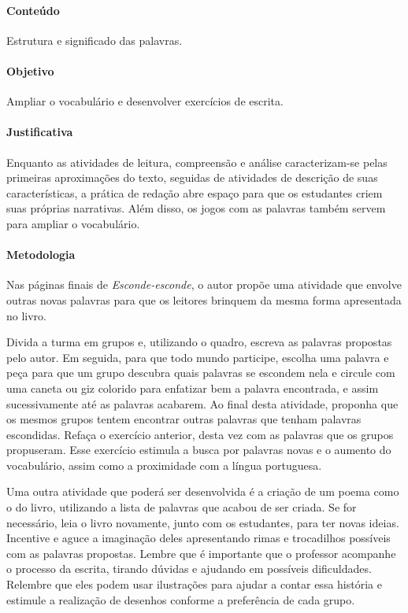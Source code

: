 \documentclass[11pt]{extarticle}
\begin{document}
\paragraph{Conteúdo} Estrutura e significado das palavras.

\paragraph{Objetivo} Ampliar o vocabulário e desenvolver exercícios de escrita.

\paragraph{Justificativa} Enquanto as atividades de leitura, compreensão e análise caracterizam-se pelas primeiras aproximações do texto, seguidas de atividades de descrição de suas características, a prática de redação abre espaço para que os estudantes criem suas próprias narrativas. Além disso, os jogos com as palavras também servem para ampliar o vocabulário. 

\paragraph{Metodologia} Nas páginas finais de \textit{Esconde-esconde}, o autor propõe uma atividade que envolve outras novas palavras para que os leitores brinquem da mesma forma apresentada no livro. 

Divida a turma em grupos e, utilizando o quadro, escreva as palavras propostas pelo autor. Em seguida, para que todo mundo participe, escolha uma palavra e peça para que um grupo descubra quais palavras se escondem nela e circule com uma caneta ou giz colorido para enfatizar bem a palavra encontrada, e assim sucessivamente até as palavras acabarem. Ao final desta atividade, proponha que os mesmos grupos tentem encontrar outras palavras que tenham palavras escondidas. Refaça o exercício anterior, desta vez com as palavras que os grupos propuseram. Esse exercício estimula a busca por palavras novas e o aumento do vocabulário, assim como a proximidade com a língua portuguesa.

Uma outra atividade que poderá ser desenvolvida é a criação de um poema como o do livro, utilizando a lista de palavras que acabou de ser criada. Se for necessário, leia  o livro novamente, junto com os estudantes, para ter novas ideias. Incentive e aguce a imaginação deles apresentando rimas e trocadilhos possíveis com as palavras propostas. Lembre que é importante que o professor acompanhe o processo da escrita, tirando dúvidas e ajudando em possíveis dificuldades. Relembre que eles podem usar ilustrações para ajudar a contar essa história e estimule a realização de desenhos conforme a preferência de cada grupo.
\end{document}

